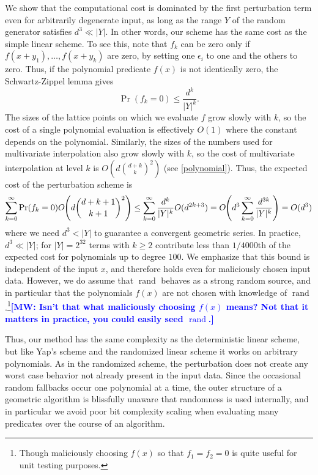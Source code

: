 \documentclass[11pt]{article}
\newcommand{\rand}{\operatorname{rand}}
\newcommand{\MW}[1]{\textcolor{blue}{\bf[MW: #1]}}
\begin{document}
We show that the computational cost is dominated by the first perturbation term even for arbitrarily degenerate input, as long as the range $Y$ of the random generator
satisfies $d^3 \ll |Y|$.  In other words, our scheme has the same cost as the simple linear scheme.  To see this, note that $f_k$ can be zero only if $f(x + y_1), \ldots, f(x + y_k)$ are zero,
by setting one $\epsilon_i$ to one and the others to zero.  Thus, if the polynomial predicate $f(x)$ is not identically zero, the Schwartz-Zippel lemma gives
$$\Pr(f_k = 0) \le \frac{d^k}{|Y|^k}.$$
The sizes of the lattice points on which we evaluate $f$ grow slowly with $k$, so the cost of a single polynomial evaluation is effectively $O(1)$ where the constant depends on the
polynomial.  Similarly, the sizes of the numbers used for multivariate interpolation also grow slowly with $k$, so the cost of multivariate
interpolation at level $k$ is $O\left(d \binom{d + k}{k}^2\right)$ (see \autoref{polynomial}).  Thus, the expected cost of the perturbation scheme is
\begin{align} \label{cost}
\sum_{k = 0}^\infty \Pr(f_k = 0) O\hspace{-.25em}\left(d \binom{d + k + 1}{k + 1}^2\right) \le \sum_{k = 0}^\infty \frac{d^k}{|Y|^k} O(d^{2k+3})
  = O\hspace{-.25em}\left(d^3 \sum_{k = 0}^\infty \frac{d^{3k}}{|Y|^k} \right) = O(d^3)
\end{align}
where we need $d^3 < |Y|$ to guarantee a convergent geometric series.  In practice, $d^3 \ll |Y|$; for $|Y| = 2^{32}$ terms with $k \ge 2$ contribute less than $1/4000$th of the expected cost
for polynomials up to degree $100$.  We emphasize that this bound is independent of the input $x$, and therefore holds even for maliciously chosen input data.  However, we do
assume that $\rand$ behaves as a strong random source, and in particular that the polynomials $f(x)$ are not chosen with knowledge of $\rand$.\footnote{Though maliciously
choosing $f(x)$ so that $f_1 = f_2 = 0$ is quite useful for unit testing purposes.}\MW{Isn't that what maliciously choosing $f(x)$ means? Not that it matters in practice, you could easily seed $\rand$.}

Thus, our method has the same complexity as the deterministic linear scheme, but like Yap's scheme and the randomized linear scheme it works on arbitrary polynomials.  As in the
randomized scheme, the perturbation does not create any worst case behavior not already present in the input data.  Since the occasional random fallbacks occur one
polynomial at a time, the outer structure of a geometric algorithm is blissfully unaware that randomness is used internally, and in particular we avoid poor bit complexity
scaling when evaluating many predicates over the course of an algorithm.
\end{document}
